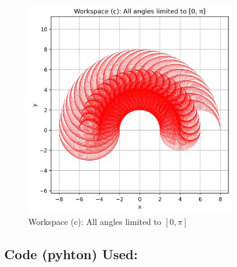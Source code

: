 \documentclass[12pt]{article}
\begin{document}
\begin{figure}[h!]
    \centering
    \includegraphics[width=0.8\textwidth]{workspace_case_c.png}
    \caption{Workspace (c): All angles limited to \( [0, \pi] \)}
    \label{fig:workspace_case_c}
\end{figure}

\clearpage
\subsection*{Code (pyhton) Used:}
\end{document}
